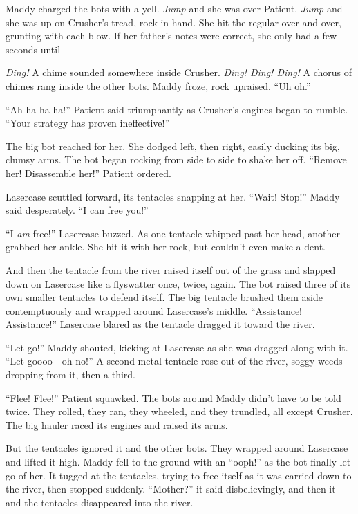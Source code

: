 \documentclass[10pt]{article}
\begin{document}
Maddy charged the bots with a yell. \emph{Jump} and she was over
Patient. \emph{Jump} and she was up on Crusher's tread, rock in hand.
She hit the regular over and over, grunting with each blow. If her
father's notes were correct, she only had a few seconds until---

\emph{Ding!} A chime sounded somewhere inside Crusher. \emph{Ding! Ding!
Ding!} A chorus of chimes rang inside the other bots. Maddy froze, rock
upraised. ``Uh oh.''

``Ah ha ha ha!'' Patient said triumphantly as Crusher's engines began to
rumble. ``Your strategy has proven ineffective!''

The big bot reached for her. She dodged left, then right, easily ducking
its big, clumsy arms. The bot began rocking from side to side to shake
her off. ``Remove her! Disassemble her!'' Patient ordered.

Lasercase scuttled forward, its tentacles snapping at her. ``Wait!
Stop!'' Maddy said desperately. ``I can free you!''

``I \emph{am} free!'' Lasercase buzzed. As one tentacle whipped past her
head, another grabbed her ankle. She hit it with her rock, but couldn't
even make a dent.

And then the tentacle from the river raised itself out of the grass and
slapped down on Lasercase like a flyswatter once, twice, again. The bot
raised three of its own smaller tentacles to defend itself. The big
tentacle brushed them aside contemptuously and wrapped around
Lasercase's middle. ``Assistance! Assistance!'' Lasercase blared as the
tentacle dragged it toward the river.

``Let go!'' Maddy shouted, kicking at Lasercase as she was dragged along
with it. ``Let goooo---oh no!'' A second metal tentacle rose out of the
river, soggy weeds dropping from it, then a third.

``Flee! Flee!'' Patient squawked. The bots around Maddy didn't have to
be told twice. They rolled, they ran, they wheeled, and they trundled,
all except Crusher. The big hauler raced its engines and raised its
arms.

But the tentacles ignored it and the other bots. They wrapped around
Lasercase and lifted it high. Maddy fell to the ground with an ``ooph!''
as the bot finally let go of her. It tugged at the tentacles, trying to
free itself as it was carried down to the river, then stopped suddenly.
``Mother?'' it said disbelievingly, and then it and the tentacles
disappeared into the river.
\end{document}
